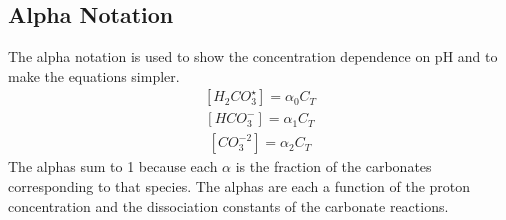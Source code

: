 \documentclass[letterpaper,10pt,english]{sphinxmanual}
\begin{document}
\subsection{Alpha Notation}
\label{\detokenize{Rapid_Mix/RM_Derivations:alpha-notation}}\label{\detokenize{Rapid_Mix/RM_Derivations:heading-alpha-notation}}
The alpha notation is used to show the concentration dependence on pH and to make the equations simpler.
\begin{equation}\label{equation:Rapid_Mix/RM_Derivations:Rapid_Mix/RM_Derivations:6}
\begin{split}\left[ {{H_2}CO_3^{\star} } \right] = {\alpha_0}{C_T}\end{split}
\end{equation}\begin{equation}\label{equation:Rapid_Mix/RM_Derivations:Rapid_Mix/RM_Derivations:7}
\begin{split}\left[ {HCO_3^-} \right] = {\alpha_1}{C_T}\end{split}
\end{equation}\begin{equation}\label{equation:Rapid_Mix/RM_Derivations:Rapid_Mix/RM_Derivations:8}
\begin{split}\left[ {CO_3^{-2}} \right] = {\alpha_2}{C_T}\end{split}
\end{equation}
The alphas sum to 1 because each \(\alpha\) is the fraction of the carbonates corresponding to that species. The alphas are each a function of the proton concentration and the dissociation constants of the carbonate reactions.
\end{document}

